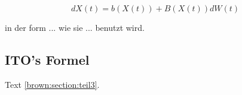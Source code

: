 \begin{equation}
	dX(t) = b(X(t)) + B(X(t)) dW(t)
\end{equation}



in der form ... wie sie ... benutzt wird.










\subsection{ITO's Formel
\label{brown:subsection:ito}}






Text
\ref{brown:section:teil3}.



